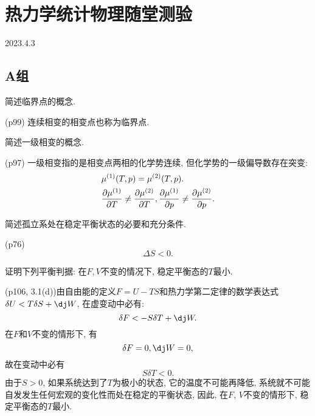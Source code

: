 \section{热力学统计物理随堂测验}
2023.4.3
\subsection{A组}
\begin{questions}
  \question 简述临界点的概念.
  \begin{solution}
    (p99) 连续相变的相变点也称为临界点.
  \end{solution}
  \question 简述一级相变的概念.
  \begin{solution}
    (p97) 一级相变指的是相变点两相的化学势连续, 但化学势的一级偏导数存在突变:
    \begin{equation}
      \begin{aligned}
         & \mu^{(1)}(T,p) = \mu^{(2)}(T,p).                                                    \\
         & \pdv{\mu^{(1)}}{T}\neq\pdv{\mu^{(2)}}{T}, \pdv{\mu^{(1)}}{p}\neq\pdv{\mu^{(2)}}{p}.
      \end{aligned}
    \end{equation}
  \end{solution}
  \question 简述孤立系处在稳定平衡状态的必要和充分条件.
  \begin{solution}
    (p76)
    \begin{equation}
      \Delta S < 0.
    \end{equation}
  \end{solution}
  \question 证明下列平衡判据: 在$F, V$不变的情况下, 稳定平衡态的$T$最小.
  \begin{solution}
    (p106, 3.1(d))由自由能的定义$F=U-TS$和热力学第二定律的数学表达式$\delta U < T\delta S + \dj W$, 在虚变动中必有:
    \begin{equation}
      \delta F < -S\delta T +\dj W.
    \end{equation}
    在$F$和$V$不变的情形下, 有
    \begin{equation}
      \delta F = 0, \dj W = 0,
    \end{equation}
    故在变动中必有
    \begin{equation}
      S\delta T <0.
    \end{equation}
    由于$S>0$, 如果系统达到了$T$为极小的状态, 它的温度不可能再降低, 系统就不可能自发发生任何宏观的变化性而处在稳定的平衡状态, 因此, 在$F$, $V$不变的情形下, 稳定平衡态的$T$最小.
  \end{solution}
\end{questions}
